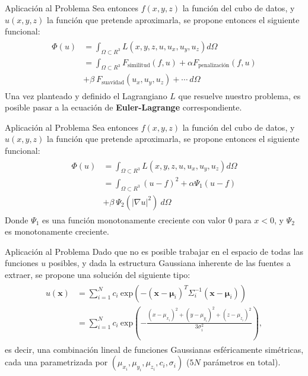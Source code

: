\documentclass{beamer}
\begin{document}
\begin{frame}{Aplicación al Problema}
Sea entonces $f(x,y,z)$ la función del cubo de datos, y $u(x,y,z)$ la función que pretende aproximarla, se propone entonces el siguiente funcional:
\begin{align*} \label{eq1}
\begin{split}
\Phi(u) & = \int_{\Omega \subset R^3} L(x, y , z , u , u_x, u_y, u_z) d\Omega \\
        & = \int_{\Omega \subset R^3} F_{\text{similitud}}(f,u) + \alpha F_{\text{penalización}}(f,u)
        \\&+ \beta \ F_{\text{suavidad}}(u_x, u_y, u_z) + \cdots \ d\Omega
\end{split}
\end{align*}
Una vez planteado y definido el Lagrangiano $L$ que resuelve nuestro problema, es posible pasar a la ecuación de
\textbf{Euler-Lagrange} correspondiente.
\end{frame}


\begin{frame}{Aplicación al Problema}
Sea entonces $f(x,y,z)$ la función del cubo de datos, y $u(x,y,z)$ la función que pretende aproximarla, se propone entonces el siguiente funcional:
\begin{align*}
\begin{split}
\Phi(u) & = \int_{\Omega \subset R^3} L(x, y , z , u , u_x, u_y, u_z) d\Omega \\
        & = \int_{\Omega \subset R^3} (u-f)^2 + \alpha \Psi_1(u-f)
        \\&+ \beta \ \Psi_2( | \nabla u |^2 ) \ d\Omega
\end{split}
\end{align*}
Donde $\Psi_1$ es una función monotonamente creciente con valor $0$ para $x < 0$, y $\Psi_2$ es monotonamente creciente. 
\end{frame}


\begin{frame}{Aplicación al Problema}
Dado que no es posible trabajar en el espacio de todas las funciones $u$ posibles, y dada la estructura Gaussiana inherente de las fuentes a extraer, se propone una solución del siguiente tipo:
\begin{align*}
\begin{split}
u(\mathbf{x}) &= \sum_{i=1}^N c_i \  \text{exp}(- (\mathbf{x}-\boldsymbol{\mu}_i)^T \Sigma_i^{-1}(\mathbf{x}-\boldsymbol{\mu}_i)) \\ 
  &= \sum_{i=1}^N c_i \  \text{exp}\left(- \frac{(x - \mu_{x_i})^2 + (y - \mu_{y_i})^2 + (z - \mu_{z_i})^2}{3 \sigma_i^2} \right),
\end{split}
\end{align*}
es decir, una combinación lineal de funciones Gaussianas esféricamente simétricas, cada una parametrizada por $(\mu_{x_i}, \mu_{y_i}, \mu_{z_i}, c_i, \sigma_i)$ ($5N$ parámetros en total).
\end{frame}
\end{document}
